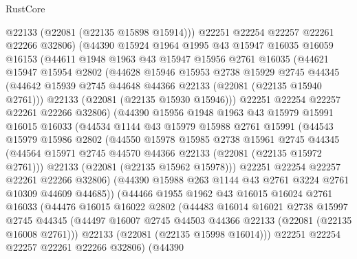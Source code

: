 \begin{lexlean}{RustCore}
\begin{coremodule}
          @22133
          (@22081 (@22135 @15898 @15914)))
        @22251
        @22254
        @22257
        @22261
        @22266
        @32806)
      (@44390
        @15924
        @1964
        @1995
        @43
        @15947
        @16035
        @16059
        @16153
        (@44611
          @1948
          @1963
          @43
          @15947
          @15956
          @2761
          @16035
          (@44621
            @15947
            @15954
            @2802
            (@44628
              @15946
              @15953
              @2738
              @15929
              @2745
              @44345
              (@44642 @15939 @2745 @44648 @44366 @22133 (@22081 (@22135 @15940 @2761)))
              @22133
              (@22081 (@22135 @15930 @15946)))
            @22251
            @22254
            @22257
            @22261
            @22266
            @32806)
          (@44390
            @15956
            @1948
            @1963
            @43
            @15979
            @15991
            @16015
            @16033
            (@44534
              @1144
              @43
              @15979
              @15988
              @2761
              @15991
              (@44543
                @15979
                @15986
                @2802
                (@44550
                  @15978
                  @15985
                  @2738
                  @15961
                  @2745
                  @44345
                  (@44564 @15971 @2745 @44570 @44366 @22133 (@22081 (@22135 @15972 @2761)))
                  @22133
                  (@22081 (@22135 @15962 @15978)))
                @22251
                @22254
                @22257
                @22261
                @22266
                @32806)
              (@44390 @15988 @263 @1144 @43 @2761 @3224 @2761 @10309 @44609 @44685))
            (@44466
              @1955
              @1962
              @43
              @16015
              @16024
              @2761
              @16033
              (@44476
                @16015
                @16022
                @2802
                (@44483
                  @16014
                  @16021
                  @2738
                  @15997
                  @2745
                  @44345
                  (@44497 @16007 @2745 @44503 @44366 @22133 (@22081 (@22135 @16008 @2761)))
                  @22133
                  (@22081 (@22135 @15998 @16014)))
                @22251
                @22254
                @22257
                @22261
                @22266
                @32806)
              (@44390

\end{coremodule}
\end{lexlean}

